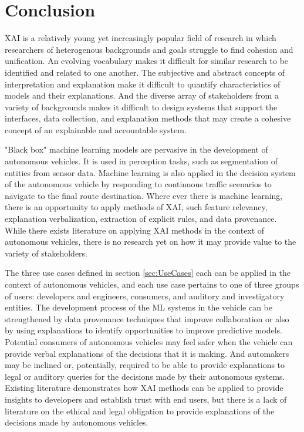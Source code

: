 \section{Conclusion}

XAI is a relatively young yet increasingly popular field of research in which researchers of heterogenous backgrounds and goals struggle to find cohesion and unification.  An evolving vocabulary makes it difficult for similar research to be identified and related to one another.  The subjective and abstract concepts of interpretation and explanation make it difficult to quantify characteristics of models and their explanations.  And the diverse array of stakeholders from a variety of backgrounds makes it difficult to design systems that support the interfaces, data collection, and explanation methods that may create a cohesive concept of an explainable and accountable system.

"Black box" machine learning models are pervasive in the development of autonomous vehicles.  It is used in perception tasks, such as segmentation of entities from sensor data.  Machine learning is also applied in the decision system of the autonomous vehicle by responding to continuous traffic scenarios to navigate to the final route destination.  Where ever there is machine learning, there is an opportunity to apply methods of XAI, such feature relevancy, explanation verbalization, extraction of explicit rules, and data provenance.  While there exists literature on applying XAI methods in the context of autonomous vehicles, there is no research yet on how it may provide value to the variety of stakeholders.

The three use cases defined in section \ref{sec:UseCases} each can be applied in the context of autonomous vehicles, and each use case pertains to one of three groups of users: developers and engineers, consumers, and auditory and investigatory entities.  The development process of the ML systems in the vehicle can be strengthened by data provenance techniques that improve collaboration or also by using explanations to identify opportunities to improve predictive models.  Potential consumers of autonomous vehicles may feel safer when the vehicle can provide verbal explanations of the decisions that it is making.  And automakers may be inclined or, potentially, required to be able to provide explanations to legal or auditory queries for the decisions made by their autonomous systems.  Existing literature demonstrates how XAI methods can be applied to provide insights to developers and establish trust with end users, but there is a lack of literature on the ethical and legal obligation to provide explanations of the decisions made by autonomous vehicles.

